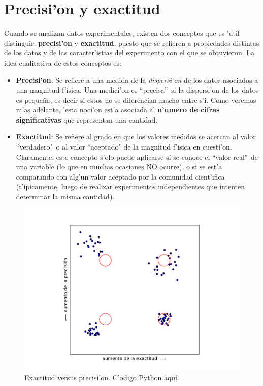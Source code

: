 \documentclass[letterpaper,11pt]{report}
\begin{document}
\section{Precisi'on y exactitud}
Cuando se analizan datos experimentales, existen dos conceptos que es 'util distinguir: \textbf{precisi'on} y \textbf{exactitud}, puesto que se refieren a propiedades distintas de los datos y de las caracter'istias del experimento con el que se obtuvieron. La idea cualitativa de estos conceptos es:
\begin{itemize}
\item \textbf{Precisi'on}: Se refiere a una medida de la \textit{dispersi'on} de los datos asociados a una magnitud f'isica. Una medici'on es ``precisa''\, si la dispersi'on de los datos es peque\~na, es decir si estos no se diferencian mucho entre s'i. Como veremos m'as adelante, 'esta noci'on est'a asociada al \textbf{n'umero de cifras significativas} que representan una cantidad.
\item \textbf{Exactitud}: Se refiere al grado en que los valores medidos se acercan al valor ``verdadero"\, o al valor ``aceptado" de la magnitud f'isica en cuesti'on. Claramente, este concepto s'olo puede aplicarse si se conoce el ``valor real"\, de una variable (lo que en muchas ocasiones NO ocurre), o si se est'a comparando con alg'un valor aceptado por la comunidad cient'ifica (t'ipicamente, luego de realizar experimentos independientes que intenten determinar la misma cantidad).
\end{itemize}

\begin{figure}[h!]
\begin{center}
\includegraphics[width=12cm]{figs/fig-ex-vs-prec.pdf}
\caption{Exactitud versus precisi'on. C'odigo Python \href{https://github.com/gfrubi/Lab/blob/master/python/fig-ex-vs-prec.py}{aqu\'i}.}
\end{center}
\end{figure}
\end{document}
